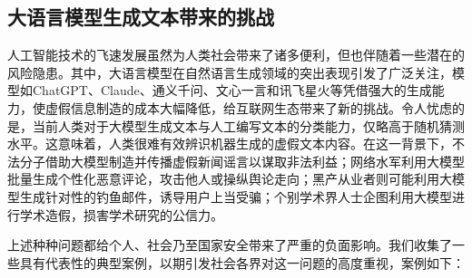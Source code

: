 \documentclass[a4paper]{report}
\begin{document}
\subsection{大语言模型生成文本带来的挑战}
人工智能技术的飞速发展虽然为人类社会带来了诸多便利，但也伴随着一些潜在的风险隐患。其中，大语言模型在自然语言生成领域的突出表现引发了广泛关注，模型如ChatGPT、Claude、通义千问、文心一言和讯飞星火等凭借强大的生成能力，使虚假信息制造的成本大幅降低，给互联网生态带来了新的挑战。令人忧虑的是，当前人类对于大模型生成文本与人工编写文本的分类能力，仅略高于随机猜测水平\cite{gehrmann2019gltr}。这意味着，人类很难有效辨识机器生成的虚假文本内容。在这一背景下，不法分子借助大模型制造并传播虚假新闻谣言以谋取非法利益；网络水军利用大模型批量生成个性化恶意评论，攻击他人或操纵舆论走向；黑产从业者则可能利用大模型生成针对性的钓鱼邮件，诱导用户上当受骗；个别学术界人士企图利用大模型进行学术造假，损害学术研究的公信力。

上述种种问题都给个人、社会乃至国家安全带来了严重的负面影响。我们收集了一些具有代表性的典型案例，以期引发社会各界对这一问题的高度重视，案例如下：
\end{document}
